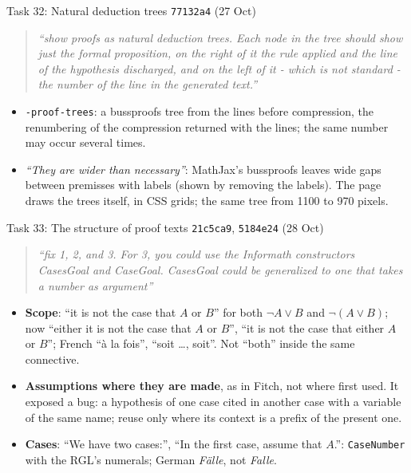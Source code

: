 \documentclass[10pt,aspectratio=169]{beamer}
\newcommand{\bad}[1]{\textcolor{warn}{#1}}
\newcommand{\ok}[1]{\textcolor{good}{#1}}
\newcommand{\commit}[1]{\texttt{\footnotesize #1}}
\newcommand{\prompt}[1]{\begin{quote}\small\itshape ``#1''\end{quote}}
\begin{document}
\begin{frame}{Task 32: Natural deduction trees}
  \commit{77132a4} (27 Oct)
  \prompt{show proofs as natural deduction trees. Each node in the tree should show just the
  formal proposition, on the right of it the rule applied and the line of the hypothesis
  discharged, and on the left of it - which is not standard - the number of the line in the
  generated text.}
  \begin{itemize}\small
    \item \texttt{-proof-trees}: a bussproofs tree from the lines before compression, the
          renumbering of the compression returned with the lines; the same number may occur
          several times.
    \item \textit{``They are wider than necessary''}: MathJax's bussproofs leaves wide gaps
          between premisses with labels (shown by removing the labels). The page draws the
          trees itself, in CSS grids; \ok{the same tree from 1100 to 970 pixels}.
  \end{itemize}
\end{frame}

\begin{frame}{Task 33: The structure of proof texts}
  \commit{21c5ca9}, \commit{5184e24} (28 Oct)
  \prompt{fix 1, 2, and 3. For 3, you could use the Informath constructors CasesGoal and
  CaseGoal. CasesGoal could be generalized to one that takes a number as argument}
  \begin{itemize}\small
    \item \textbf{Scope}: \bad{``it is not the case that $A$ or $B$''} for both
          $\neg A \lor B$ and $\neg(A \lor B)$; now \ok{``either it is not the case that $A$ or
          $B$''}, \ok{``it is not the case that either $A$ or $B$''}; French ``à la fois'',
          ``soit \dots, soit''. Not ``both'' inside the same connective.
    \item \textbf{Assumptions where they are made}, as in Fitch, not where first used.
          It exposed a bug: a hypothesis of one case cited in another case with a variable of
          the same name; reuse only where its context is a prefix of the present one.
    \item \textbf{Cases}: ``We have two cases:'', ``In the first case, assume that $A$.'':
          \texttt{CaseNumber} with the RGL's numerals; German \ok{\emph{Fälle}}, not
          \bad{\emph{Falle}}.
  \end{itemize}
\end{frame}
\end{document}
